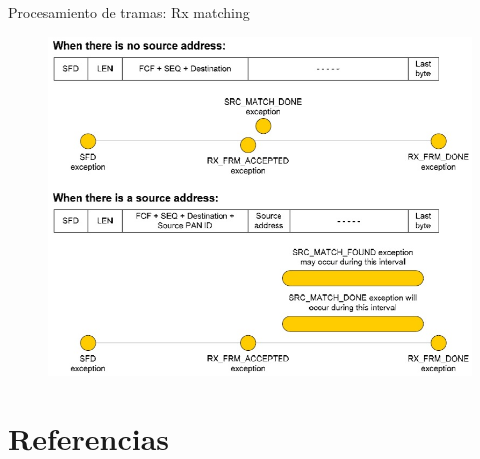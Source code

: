 \documentclass[aspectratio=169]{beamer}
\begin{document}
\begin{frame}{Procesamiento de tramas: Rx matching}
	\begin{figure}[H]
		\includegraphics[height=.95\textheight]{./imagenes/matching.jpg}
	\end{figure}	
\end{frame}


\section{Referencias}
\end{document}
